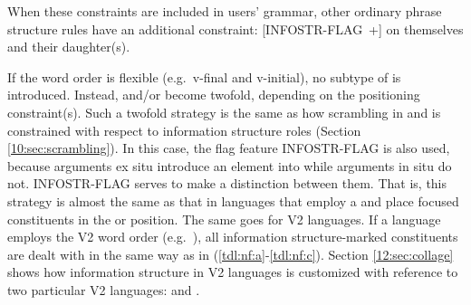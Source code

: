 




\noindent When these constraints are included in users' grammar, other
ordinary phrase structure rules have an additional constraint:
\mbox{[INFOSTR-FLAG +]} on themselves and their daughter(s).



If the word order is flexible (e.g.\ v-final and v-initial), no
subtype of  is introduced. Instead,
 and/or  become twofold,
depending on the positioning constraint(s).  Such a twofold strategy
is the same as how scrambling in  and  is
constrained with respect to information structure roles
(Section \ref{10:sec:scrambling}). In this case, the
flag feature INFOSTR-FLAG is also used, because arguments ex
situ introduce an  element into  while
arguments in situ do not. INFOSTR-FLAG serves to make a
distinction between them. That is, this strategy is almost the same as
that in languages that employ a  and place
focused constituents in the  or 
position. The same goes for V2 languages.  If a language employs the
V2 word order (e.g.\ ), all information structure-marked
constituents are dealt with in the same way as in
(\ref{tdl:nf:a}-\ref{tdl:nf:c}).  Section \ref{12:sec:collage} shows how
information structure in V2 languages is customized with reference to
two particular V2 languages:  and .


